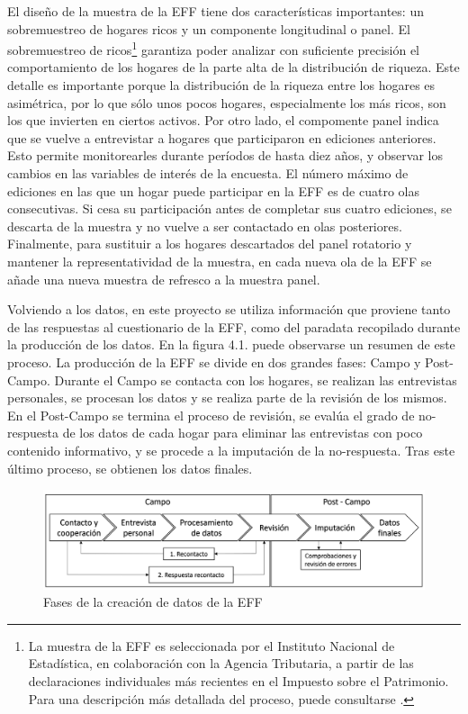 El diseño de la muestra de la EFF tiene dos características importantes: un sobremuestreo de hogares ricos y un componente longitudinal o panel. El sobremuestreo de ricos\footnote{La muestra de la EFF es seleccionada por el Instituto Nacional de Estadística, en colaboración con la Agencia Tributaria, a partir de las declaraciones individuales más recientes en el Impuesto sobre el Patrimonio. Para una descripción más detallada del proceso, puede consultarse \cite{effmethod2017}.} garantiza poder analizar con suficiente precisión el comportamiento de los hogares de la parte alta de la distribución de riqueza. Este detalle es importante porque la distribución de la riqueza entre los hogares es asimétrica, por lo que sólo unos pocos hogares, especialmente los más ricos, son los que invierten en ciertos activos. Por otro lado, el compomente panel indica que se vuelve a entrevistar a hogares que participaron en ediciones anteriores. Esto permite monitorearles durante períodos de hasta diez años, y observar los cambios en las variables de interés de la encuesta. El número máximo de ediciones en las que un hogar puede participar en la EFF es de cuatro olas consecutivas. Si cesa su participación antes de completar sus cuatro ediciones, se descarta de la muestra y no vuelve a ser contactado en olas posteriores. Finalmente, para sustituir a los hogares descartados del panel rotatorio y mantener la representatividad de la muestra, en cada nueva ola de la EFF se añade una nueva muestra de refresco a la muestra panel.

Volviendo a los datos, en este proyecto se utiliza información que proviene tanto de las respuestas al cuestionario de la EFF, como del paradata recopilado durante la producción de los datos. En la figura 4.1. puede observarse un resumen de este proceso. La producción de la EFF se divide en dos grandes fases: Campo y Post-Campo. Durante el Campo se contacta con los hogares, se realizan las entrevistas personales, se procesan los datos y se realiza parte de la revisión de los mismos. En el Post-Campo se termina el proceso de revisión, se evalúa el grado de no-respuesta de los datos de cada hogar para eliminar las entrevistas con poco contenido informativo, y se procede a la imputación de la no-respuesta. Tras este último proceso, se obtienen los datos finales.

\begin{figure}[h]
	\centering
	\includegraphics[width=1\textwidth]{figs/fases_creacion_datos_eff.png}
	\caption{Fases de la creación de datos de la EFF}
	\label{fig:eff_phases}
\end{figure}

